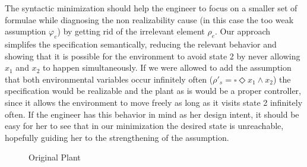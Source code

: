 The syntactic minimization should help the engineer to focus on a smaller set of formulae while diagnosing the non realizability cause (in this case the too weak assumption $\varphi_e$) by getting rid of the irrelevant element $\rho_e$. Our approach simplifes the specification semantically, reducing the relevant behavior and showing that it is possible for the environment to avoid state 2 by never allowing $x_1$ and $x_2$ to happen simultaneously. If we were allowed to add the assumption that both environmental variables occur infinitely often ($\rho'_s = \square \Diamond x_1 \wedge x_2$) the specification would be realizable and the plant as is would be a proper controller, since it allows the environment to move freely as long as it visits state 2 infinitely often. If the engineer has this behavior in mind as her design intent, it should be easy for her to see that in our minimization the desired state is unreachable, hopefully guiding her to the strengthening of the assumption.  
\clearpage
\begin{figure}[bt]
	\centering
	\SmallPicture
	\caption{Original Plant}
\label{fig:konig_original_plant_2}
\MediumPicture
\end{figure}
